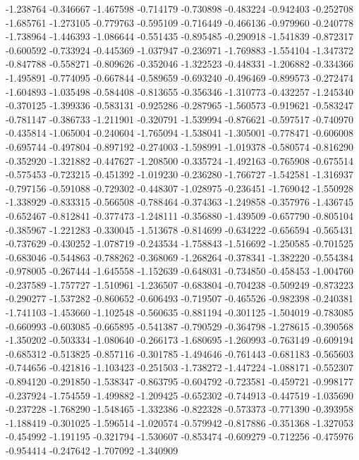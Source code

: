 -1.238764
-0.346667
-1.467598
-0.714179
-0.730898
-0.483224
-0.942403
-0.252708
-1.685761
-1.273105
-0.779763
-0.595109
-0.716449
-0.466136
-0.979960
-0.240778
-1.738964
-1.446393
-1.086644
-0.551435
-0.895485
-0.290918
-1.541839
-0.872317
-0.600592
-0.733924
-0.445369
-1.037947
-0.236971
-1.769883
-1.554104
-1.347372
-0.847788
-0.558271
-0.809626
-0.352046
-1.322523
-0.448331
-1.206882
-0.334366
-1.495891
-0.774095
-0.667844
-0.589659
-0.693240
-0.496469
-0.899573
-0.272474
-1.604893
-1.035498
-0.584408
-0.813655
-0.356346
-1.310773
-0.432257
-1.245340
-0.370125
-1.399336
-0.583131
-0.925286
-0.287965
-1.560573
-0.919621
-0.583247
-0.781147
-0.386733
-1.211901
-0.320791
-1.539994
-0.876621
-0.597517
-0.740970
-0.435814
-1.065004
-0.240604
-1.765094
-1.538041
-1.305001
-0.778471
-0.606008
-0.695744
-0.497804
-0.897192
-0.274003
-1.598991
-1.019378
-0.580574
-0.816290
-0.352920
-1.321882
-0.447627
-1.208500
-0.335724
-1.492163
-0.765908
-0.675514
-0.575453
-0.723215
-0.451392
-1.019230
-0.236280
-1.766727
-1.542581
-1.316937
-0.797156
-0.591088
-0.729302
-0.448307
-1.028975
-0.236451
-1.769042
-1.550928
-1.338929
-0.833315
-0.566508
-0.788464
-0.374363
-1.249858
-0.357976
-1.436745
-0.652467
-0.812841
-0.377473
-1.248111
-0.356880
-1.439509
-0.657790
-0.805104
-0.385967
-1.221283
-0.330045
-1.513678
-0.814699
-0.634222
-0.656594
-0.565431
-0.737629
-0.430252
-1.078719
-0.243534
-1.758843
-1.516692
-1.250585
-0.701525
-0.683046
-0.544863
-0.788262
-0.368069
-1.268264
-0.378341
-1.382220
-0.554384
-0.978005
-0.267444
-1.645558
-1.152639
-0.648031
-0.734850
-0.458453
-1.004760
-0.237589
-1.757727
-1.510961
-1.236507
-0.683804
-0.704238
-0.509249
-0.873223
-0.290277
-1.537282
-0.860652
-0.606493
-0.719507
-0.465526
-0.982398
-0.240381
-1.741103
-1.453660
-1.102548
-0.560635
-0.881194
-0.301125
-1.504019
-0.783085
-0.660993
-0.603085
-0.665895
-0.541387
-0.790529
-0.364798
-1.278615
-0.390568
-1.350202
-0.503334
-1.080640
-0.266173
-1.680695
-1.260993
-0.763149
-0.609194
-0.685312
-0.513825
-0.857116
-0.301785
-1.494646
-0.761443
-0.681183
-0.565603
-0.744656
-0.421816
-1.103423
-0.251503
-1.738272
-1.447224
-1.088171
-0.552307
-0.894120
-0.291850
-1.538347
-0.863795
-0.604792
-0.723581
-0.459721
-0.998177
-0.237924
-1.754559
-1.499882
-1.209425
-0.652302
-0.744913
-0.447519
-1.035690
-0.237228
-1.768290
-1.548465
-1.332386
-0.822328
-0.573373
-0.771390
-0.393958
-1.188419
-0.301025
-1.596514
-1.020574
-0.579942
-0.817886
-0.351368
-1.327053
-0.454992
-1.191195
-0.321794
-1.530607
-0.853474
-0.609279
-0.712256
-0.475976
-0.954414
-0.247642
-1.707092
-1.340909
